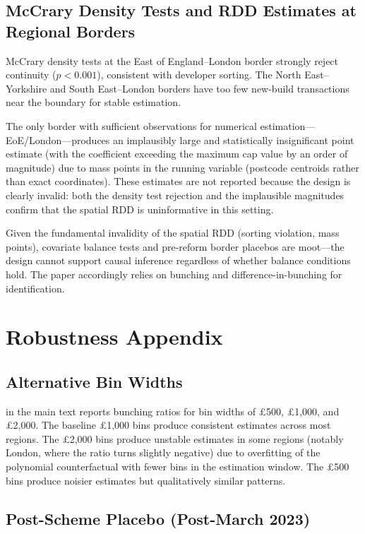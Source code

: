 \documentclass[12pt]{article}
\begin{document}
\subsection{McCrary Density Tests and RDD Estimates at Regional Borders}

McCrary density tests at the East of England--London border strongly reject continuity ($p < 0.001$), consistent with developer sorting. The North East--Yorkshire and South East--London borders have too few new-build transactions near the boundary for stable estimation.

The only border with sufficient observations for numerical estimation---EoE/London---produces an implausibly large and statistically insignificant point estimate (with the coefficient exceeding the maximum cap value by an order of magnitude) due to mass points in the running variable (postcode centroids rather than exact coordinates). These estimates are not reported because the design is clearly invalid: both the density test rejection and the implausible magnitudes confirm that the spatial RDD is uninformative in this setting.

Given the fundamental invalidity of the spatial RDD (sorting violation, mass points), covariate balance tests and pre-reform border placebos are moot---the design cannot support causal inference regardless of whether balance conditions hold. The paper accordingly relies on bunching and difference-in-bunching for identification.

\section{Robustness Appendix}\label{app:robustness}

\subsection{Alternative Bin Widths}

 in the main text reports bunching ratios for bin widths of \pounds500, \pounds1,000, and \pounds2,000. The baseline \pounds1,000 bins produce consistent estimates across most regions. The \pounds2,000 bins produce unstable estimates in some regions (notably London, where the ratio turns slightly negative) due to overfitting of the polynomial counterfactual with fewer bins in the estimation window. The \pounds500 bins produce noisier estimates but qualitatively similar patterns.

\subsection{Post-Scheme Placebo (Post-March 2023)}
\end{document}
